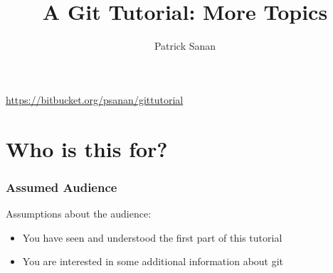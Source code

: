 \documentclass{beamer}
\author{Patrick Sanan}
\title{A Git Tutorial: More Topics}
\subtitle[]{}
\date[]{}
\begin{document}

\begin{frame}[fragile]
\titlepage
\begin{center}
\href{https://bitbucket.org/psanan/gittutorial}{https://bitbucket.org/psanan/gittutorial}
\end{center}
\end{frame}


\begin{frame}
\tableofcontents
\end{frame}

\section{Who is this for?}
\begin{frame}[fragile]
\frametitle{Assumed Audience}
Assumptions about the audience:
\begin{itemize}
\item You have seen and understood the first part of this tutorial
\item You are interested in some additional information about git
\end{itemize}
\end{frame}
\end{document}
